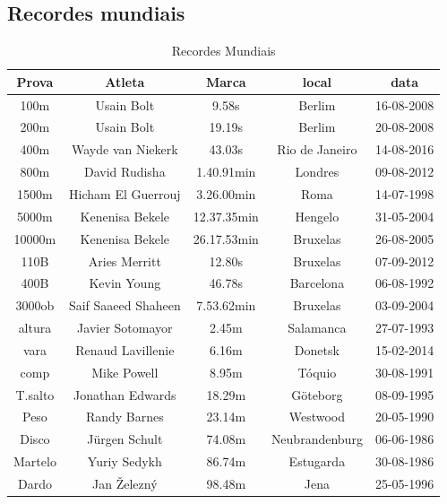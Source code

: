 \documentclass{report}
\begin{document}
    
     \subsection{Recordes mundiais}
     \FloatBarrier
     \begin{table}[h]
     
     
     \caption{Recordes Mundiais}
     
         
         \begin{tabular}{|c|c|c|c|c|}
            \hline
            Prova & Atleta & Marca & local & data  \\ \hline
            100m & Usain Bolt & 9.58s & Berlim & 16-08-2008 \\ \hline
            200m & Usain Bolt & 19.19s & Berlim & 20-08-2008 \\ \hline
            400m & Wayde van Niekerk & 43.03s & Rio de Janeiro & 14-08-2016 \\ \hline
            800m & David Rudisha &  1.40.91min & Londres & 09-08-2012 \\ \hline
            1500m & Hicham El Guerrouj & 3.26.00min & Roma & 14-07-1998 \\ \hline
            5000m & Kenenisa Bekele & 12.37.35min & Hengelo & 31-05-2004 \\ \hline
            10000m & Kenenisa Bekele & 26.17.53min & Bruxelas &  26-08-2005 \\ \hline
            110B & Aries Merritt & 12.80s & Bruxelas & 07-09-2012 \\ \hline
            400B & Kevin Young & 46.78s & Barcelona & 06-08-1992 \\ \hline
            3000ob & Saif Saaeed Shaheen & 7.53.62min & Bruxelas & 03-09-2004 \\ \hline
            altura & Javier Sotomayor & 2.45m & Salamanca & 27-07-1993 \\ \hline
            vara & Renaud Lavillenie & 6.16m & Donetsk & 15-02-2014 \\ \hline
            comp & Mike Powell & 8.95m & Tóquio & 30-08-1991 \\ \hline
            T.salto & Jonathan Edwards & 18.29m & Göteborg & 08-09-1995 \\ \hline
            Peso & Randy Barnes & 23.14m & Westwood & 20-05-1990 \\ \hline 
            Disco & Jürgen Schult & 74.08m & Neubrandenburg & 06-06-1986 \\ \hline
            Martelo & Yuriy Sedykh & 86.74m & Estugarda & 30-08-1986 \\ \hline
            Dardo & Jan Železný & 98.48m & Jena & 25-05-1996 \\ \hline
        \end{tabular}
        \label{tab:recordesmundias} \cite{recordesmundiass}
        
     \end{table}
     \FloatBarrier
            
\end{document}
